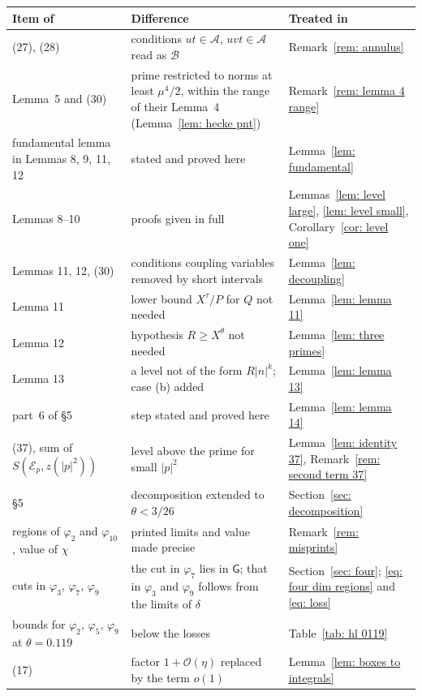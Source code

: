 \documentclass{article}
\numberwithin{equation}{section}
\newcommand{\Ge}{\geqslant}
\begin{document}
\begin{table}[ht]
\centering
\small
\begin{tabular}{p{4.3cm}p{5.6cm}p{4.9cm}}
\toprule
Item of \citet{harman2001gaussian} & Difference & Treated in \\
\midrule
(27), (28) & conditions $ut \in \mathcal{A}$, $uvt \in \mathcal{A}$ read as $\mathcal{B}$ & Remark~\ref{rem: annulus} \\
Lemma~5 and (30) & prime restricted to norms at least $\mu^4/2$, within the range of their Lemma~4 (Lemma~\ref{lem: hecke pnt}) & Remark~\ref{rem: lemma 4 range} \\
fundamental lemma in Lemmas 8, 9, 11, 12 & stated and proved here & Lemma~\ref{lem: fundamental} \\
Lemmas 8--10 & proofs given in full & Lemmas~\ref{lem: level large}, \ref{lem: level small}, Corollary~\ref{cor: level one} \\
Lemmas 11, 12, (30) & conditions coupling variables removed by short intervals & Lemma~\ref{lem: decoupling} \\
Lemma 11 & lower bound $X^{\tau}/P$ for $Q$ not needed & Lemma~\ref{lem: lemma 11} \\
Lemma 12 & hypothesis $R \Ge X^{\theta}$ not needed & Lemma~\ref{lem: three primes} \\
Lemma 13 & a level not of the form $R|n|^k$; case (b) added & Lemma~\ref{lem: lemma 13} \\
part~6 of \S5 & step stated and proved here & Lemma~\ref{lem: lemma 14} \\
(37), sum of $S(\mathcal{E}_p, z(|p|^2))$ & level above the prime for small $|p|^2$ & Lemma~\ref{lem: identity 37}, Remark~\ref{rem: second term 37} \\
\S5 & decomposition extended to $\theta < 3/26$ & Section~\ref{sec: decomposition} \\
regions of $\varphi_2$ and $\varphi_{10}$, value of $\chi$ & printed limits and value made precise & Remark~\ref{rem: misprints} \\
cuts in $\varphi_3$, $\varphi_7$, $\varphi_9$ & the cut in $\varphi_7$ lies in $\mathsf{G}$; that in $\varphi_3$ and $\varphi_9$ follows from the limits of $\delta$ & Section~\ref{sec: four}; \eqref{eq: four dim regions} and \eqref{eq: loss} \\
bounds for $\varphi_2$, $\varphi_5$, $\varphi_9$ at $\theta = 0.119$ & below the losses & Table~\ref{tab: hl 0119} \\
(17) & factor $1 + \mathcal{O}(\eta)$ replaced by the term $o(1)$ & Lemma~\ref{lem: boxes to integrals} \\

\end{tabular}
\end{table}
\end{document}
